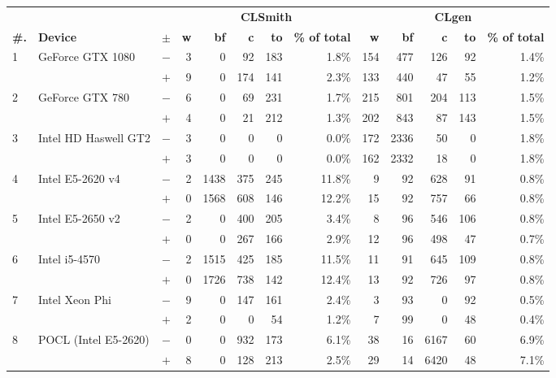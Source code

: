   \begin{tabular}{lll | rrrrr | rrrrr }
  \toprule
  & & & \multicolumn{5}{c|}{\textbf{CLSmith}} & \multicolumn{5}{c}{\textbf{CLgen}} \\
  \textbf{\#.} & \textbf{Device} & $\pm$ &
  \textbf{w} & \textbf{bf} & \textbf{c} & \textbf{to} & \textbf{\% of total} &
  \textbf{w} & \textbf{bf} & \textbf{c} & \textbf{to} & \textbf{\% of total} \\
  \midrule
  \multirow{ 2}{*}{1} & \multirow{ 2}{*}{GeForce GTX 1080} & $-$ & 3 & 0 & 92 & 183 & 1.8\%       & 154 & 477 & 126 & 92 & 1.4\% \\& & $+$ & 9 & 0 & 174 & 141 & 2.3\% & 133 & 440 & 47 & 55 & 1.2\% \\
\hline
\multirow{ 2}{*}{2} & \multirow{ 2}{*}{GeForce GTX 780} & $-$ & 6 & 0 & 69 & 231 & 1.7\%       & 215 & 801 & 204 & 113 & 1.5\% \\& & $+$ & 4 & 0 & 21 & 212 & 1.3\% & 202 & 843 & 87 & 143 & 1.5\% \\
\hline
\multirow{ 2}{*}{3} & \multirow{ 2}{*}{Intel HD Haswell GT2} & $-$ & 3 & 0 & 0 & 0 & 0.0\%       & 172 & 2336 & 50 & 0 & 1.8\% \\& & $+$ & 3 & 0 & 0 & 0 & 0.0\% & 162 & 2332 & 18 & 0 & 1.8\% \\
\hline
\multirow{ 2}{*}{4} & \multirow{ 2}{*}{Intel E5-2620 v4} & $-$ & 2 & 1438 & 375 & 245 & 11.8\%       & 9 & 92 & 628 & 91 & 0.8\% \\& & $+$ & 0 & 1568 & 608 & 146 & 12.2\% & 15 & 92 & 757 & 66 & 0.8\% \\
\hline
\multirow{ 2}{*}{5} & \multirow{ 2}{*}{Intel E5-2650 v2} & $-$ & 2 & 0 & 400 & 205 & 3.4\%       & 8 & 96 & 546 & 106 & 0.8\% \\& & $+$ & 0 & 0 & 267 & 166 & 2.9\% & 12 & 96 & 498 & 47 & 0.7\% \\
\hline
\multirow{ 2}{*}{6} & \multirow{ 2}{*}{Intel i5-4570} & $-$ & 2 & 1515 & 425 & 185 & 11.5\%       & 11 & 91 & 645 & 109 & 0.8\% \\& & $+$ & 0 & 1726 & 738 & 142 & 12.4\% & 13 & 92 & 726 & 97 & 0.8\% \\
\hline
\multirow{ 2}{*}{7} & \multirow{ 2}{*}{Intel Xeon Phi} & $-$ & 9 & 0 & 147 & 161 & 2.4\%       & 3 & 93 & 0 & 92 & 0.5\% \\& & $+$ & 2 & 0 & 0 & 54 & 1.2\% & 7 & 99 & 0 & 48 & 0.4\% \\
\hline
\multirow{ 2}{*}{8} & \multirow{ 2}{*}{POCL (Intel E5-2620)} & $-$ & 0 & 0 & 932 & 173 & 6.1\%       & 38 & 16 & 6167 & 60 & 6.9\% \\& & $+$ & 8 & 0 & 128 & 213 & 2.5\% & 29 & 14 & 6420 & 48 & 7.1\% \\

\end{tabular}
